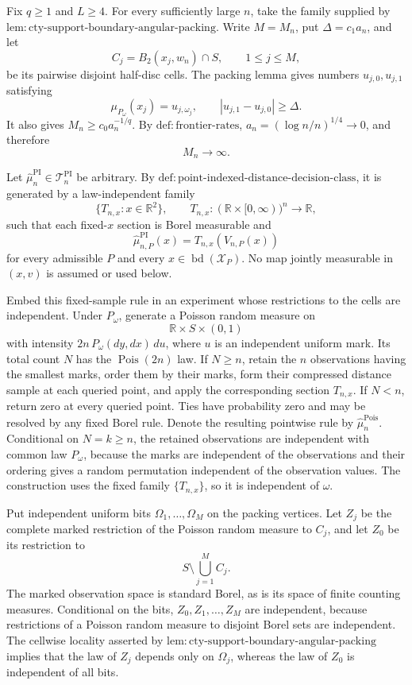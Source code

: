 Fix \(q\geq1\) and \(L\geq4\).  For every sufficiently large \(n\), take the family supplied by \(\mathrm{lem:cty\text{-}support\text{-}boundary\text{-}angular\text{-}packing}\).  Write \(M=M_n\), put \(\Delta=c_1a_n\), and let
\[
 C_j=B_2(x_j,w_n)\cap S,
 \qquad 1\leq j\leq M,
\]
be its pairwise disjoint half-disc cells.  The packing lemma gives numbers \(u_{j,0},u_{j,1}\) satisfying
\[
 \mu_{P_\omega}(x_j)=u_{j,\omega_j},
 \qquad |u_{j,1}-u_{j,0}|\geq\Delta.
\]
It also gives \(M_n\geq c_0a_n^{-1/q}\).  By \(\mathrm{def:frontier\text{-}rates}\), \(a_n=(\log n/n)^{1/4}\to0\), and therefore
\[
 M_n\longrightarrow\infty.
\]

Let \(\widehat\mu_n^{\mathrm{PI}}\in\mathcal T_n^{\mathrm{PI}}\) be arbitrary.  By \(\mathrm{def:point\text{-}indexed\text{-}distance\text{-}decision\text{-}class}\), it is generated by a law-independent family
\[
 \{T_{n,x}:x\in\mathbb R^2\},
 \qquad
 T_{n,x}:(\mathbb R\times[0,\infty))^n\longrightarrow\mathbb R,
\]
such that each fixed-\(x\) section is Borel measurable and
\[
 \widehat\mu_{n,P}^{\mathrm{PI}}(x)
 =T_{n,x}(V_{n,P}(x))
\]
for every admissible \(P\) and every \(x\in\operatorname{bd}(\mathcal X_P)\).  No map jointly measurable in \((x,v)\) is assumed or used below.

Embed this fixed-sample rule in an experiment whose restrictions to the cells are independent.  Under \(P_\omega\), generate a Poisson random measure on
\[
 \mathbb R\times S\times(0,1)
\]
with intensity \(2n\,P_\omega(dy,dx)\,du\), where \(u\) is an independent uniform mark.  Its total count \(N\) has the \(\operatorname{Pois}(2n)\) law.  If \(N\geq n\), retain the \(n\) observations having the smallest marks, order them by their marks, form their compressed distance sample at each queried point, and apply the corresponding section \(T_{n,x}\).  If \(N<n\), return zero at every queried point.  Ties have probability zero and may be resolved by any fixed Borel rule.  Denote the resulting pointwise rule by \(\widehat\mu_n^{\mathrm{Pois}}\).  Conditional on \(N=k\geq n\), the retained observations are independent with common law \(P_\omega\), because the marks are independent of the observations and their ordering gives a random permutation independent of the observation values.  The construction uses the fixed family \(\{T_{n,x}\}\), so it is independent of \(\omega\).

Put independent uniform bits \(\Omega_1,\ldots,\Omega_M\) on the packing vertices.  Let \(Z_j\) be the complete marked restriction of the Poisson random measure to \(C_j\), and let \(Z_0\) be its restriction to
\[
 S\setminus\bigcup_{j=1}^M C_j.
\]
The marked observation space is standard Borel, as is its space of finite counting measures.  Conditional on the bits, \(Z_0,Z_1,\ldots,Z_M\) are independent, because restrictions of a Poisson random measure to disjoint Borel sets are independent.  The cellwise locality asserted by \(\mathrm{lem:cty\text{-}support\text{-}boundary\text{-}angular\text{-}packing}\) implies that the law of \(Z_j\) depends only on \(\Omega_j\), whereas the law of \(Z_0\) is independent of all bits.

